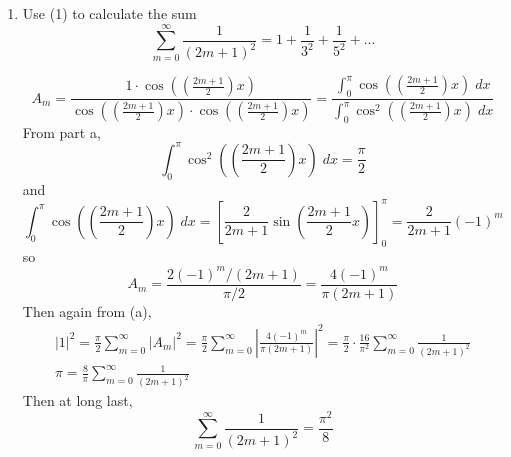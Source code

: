 \documentclass[12pt]{article}
\begin{document}
\begin{enumerate}
    \color{black}
    \item Use (1) to calculate the sum 
    \[\sum_{m=0}^\infty \frac{1}{(2m+1)^2} = 1 + \frac{1}{3^2} + \frac{1}{5^2} + ...\]

    \color{blue}
    \[A_m = \frac{1 \cdot \cos\left(\left(\frac{2m+1}{2}\right)x\right)}{\cos\left(\left(\frac{2m+1}{2}\right)x\right) \cdot \cos\left(\left(\frac{2m+1}{2}\right)x\right)} = \frac{\int_0^\pi\cos\left(\left(\frac{2m+1}{2}\right)x\right)\; dx}{\int_0^\pi \cos^2\left(\left(\frac{2m+1}{2}\right)x\right)\; dx}\]
    From part a, 
    \[\int_0^\pi \cos^2\left(\left(\frac{2m+1}{2}\right)x\right)\; dx = \frac{\pi}{2}\]
    and 
    \[\int_0^\pi\cos\left(\left(\frac{2m+1}{2}\right)x\right)\; dx = \left[\frac{2}{2m+1}\sin\left(\frac{2m+1}{2}x\right)\right]_0^\pi = \frac{2}{2m+1}(-1)^m\]
    so 
    \[A_m = \frac{2(-1)^m / (2m+1)}{\pi/2} = \frac{4(-1)^m}{\pi(2m + 1)}\]
    Then again from (a), 
    \begin{gather*}
        |1|^2 = \frac{\pi}{2}\sum_{m=0}^\infty |A_m|^2 = \frac{\pi}{2}\sum_{m=0}^\infty \left|\frac{4(-1)^m}{\pi (2m +1)}\right|^2 = \frac{\pi}{2} \cdot \frac{16}{\pi^2} \sum_{m=0}^\infty \frac{1}{(2m+1)^2}\\
        \pi = \frac{8}{\pi} \sum_{m=0}^\infty \frac{1}{(2m+1)^2}
    \end{gather*}
    Then at long last, 
    \[\boxed{\sum_{m=0}^\infty \frac{1}{(2m +1)^2} = \frac{\pi^2}{8}}\]
\end{enumerate}

\pagebreak
\end{document}

